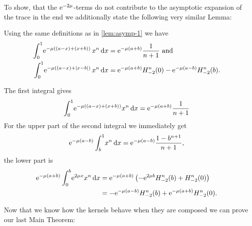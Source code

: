 To show, that the $\Eto{-2\mu}$-terms do not contribute to the asymptotic
expansion of the trace in the end we additionally state the following very
similar Lemma:
\begin{Lemma}
  \label{lem:asymp-2}
  Using the same definitions as in \cref{lem:asymp-1} we have
  \begin{align*}
    \Int{x}{\Eto{-\mu((a-x) + (x+b))}\,x^n} &= \Eto{-\mu(a+b)}\frac{1}{n+1}
    \text{ and } \\
\Int{x}{\Eto{-\mu((a-x) + \Abs{x-b})}\,x^n} &= \Eto{-\mu(a+b)}H^n_{-2}(0) -
    \Eto{-\mu(a-b)}H^n_{-2}(b).
  \end{align*}
  \begin{Proof}
    The first integral gives
    \begin{equation*}
      \Int{x}{\Eto{-\mu((a-x)+(x+b))}x^n} = \Eto{-\mu(a+b)}\frac{1}{n+1}
    \end{equation*}
    For the upper part of the second integral we immediately get
    \begin{equation*}
      \Eto{-\mu(a-b)}\Integ[1]{b}{x}{x^n} =
      \Eto{-\mu(a-b)}\frac{1-b^{n+1}}{n+1},
    \end{equation*}
    the lower part is
    \begin{align*}
      \Eto{-\mu(a+b)}\Integ[b]{0}{x}{\Eto{2\mu x}x^n} &=
      \Eto{-\mu(a+b)}\left(-\Eto{2\mu b}H^n_{-2}(b) + H^n_{-2}(0)\right) \\
      &= -\Eto{-\mu(a-b)}H^n_{-2}(b) + \Eto{-\mu(a+b)}H^n_{-2}(0).
    \end{align*}
  \end{Proof}
\end{Lemma}
Now that we know how the kernels behave when they are composed we can prove
our last Main Theorem:
